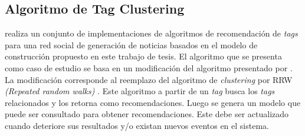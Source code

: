  

\subsection{Algoritmo de Tag Clustering}

\cite{Hernandez:2014} realiza un conjunto de implementaciones de algoritmos de recomendación de \textit{tags} para una red social de generación de noticias basados en el modelo de construcción propuesto en este trabajo de tesis. El algoritmo que se presenta como caso de estudio   se basa en un modificación del algoritmo presentado por \cite{Begelman:2006}. La modificación corresponde al reemplazo del algoritmo de \textit{clustering} por RRW \textit{(Repeated random walks)} \citep{Macropol:2009}. Este algoritmo a partir de un \textit{tag} busca los \textit{tags} relacionados y los retorna como recomendaciones. Luego se genera un modelo que puede ser consultado para obtener recomendaciones. Este  debe ser actualizado cuando deteriore sus resultados y/o existan nuevos eventos en el sistema.

%







